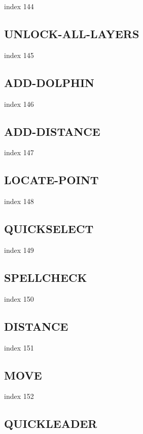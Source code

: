 \documentclass[a4paper]{report}
\begin{document}
index 144

\subsection{UNLOCK-ALL-LAYERS}

index 145

\subsection{ADD-DOLPHIN}

index 146

\subsection{ADD-DISTANCE}

index 147

\subsection{LOCATE-POINT}

index 148

\subsection{QUICKSELECT}

index 149

\subsection{SPELLCHECK}

index 150

\subsection{DISTANCE}

index 151

\subsection{MOVE}

index 152

\subsection{QUICKLEADER}
\end{document}
